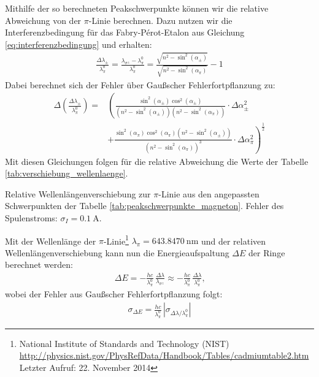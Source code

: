\documentclass[11pt, a4paper]{article}
\begin{document}
Mithilfe der so berechneten Peakschwerpunkte können wir die relative Abweichung von der $\pi$-Linie berechnen.
Dazu nutzen wir die Interferenzbedingung für das Fabry-Pérot-Etalon aus Gleichung \ref{eq:interferenzbedingung} und erhalten:
\begin{align}
	\frac{\Delta \lambda_\pm}{\lambda_\pi^0} = \frac{\lambda_{\sigma^\pm} - \lambda_\pi^0}{\lambda_\pi^0} = \frac{\sqrt{n^2 - \sin^2(\alpha_{\pm})}}{\sqrt{n^2 - \sin^2(\alpha_\pi)}} - 1
\end{align}
Dabei berechnet sich der  Fehler über Gaußscher Fehlerfortpflanzung zu:
\begin{align}
	\Delta \left( \frac{\Delta \lambda_\pm}{\lambda_\pi^0} \right) = & \left( \frac{\sin^2(\alpha_\pm) \cos^2(\alpha_\pm)}{(n^2-\sin^2(\alpha_\pm))(n^2-\sin^2(\alpha_\pi))} \cdot \Delta \alpha_\pm^2 \right. \nonumber\\
	& \left. + \frac{\sin^2(\alpha_\pi) \cos^2(\alpha_\pi) (n^2 - \sin^2(\alpha_\pm))}{(n^2-\sin^2(\alpha_\pi))^3} \cdot \Delta \alpha_\pi^2\right)^\frac{1}{2}
\end{align}
Mit diesen Gleichungen folgen für die relative Abweichung die Werte der Tabelle \ref{tab:verschiebung_wellenlaenge}. 
\begin{table}[h]
	\centering
	
	\caption{Relative Wellenlängenverschiebung zur $\pi$-Linie aus den angepassten Schwerpunkten der Tabelle \ref{tab:peakschwerpunkte_magneton}. Fehler des Spulenstroms: $\sigma_I = \SI{0.1}{\ampere}$.}
	\label{tab:verschiebung_wellenlaenge}
\end{table}
Mit der Wellenlänge der $\pi$-Linie\footnote{National Institute of Standards and Technology (NIST)\\ \url{http://physics.nist.gov/PhysRefData/Handbook/Tables/cadmiumtable2.htm}\\Letzter Aufruf: 22. November 2014} $\lambda_\pi = \SI{643,8470}{\nano\metre}$  und der relativen Wellenlängenverschiebung kann nun die Energieaufspaltung $\Delta E$ der Ringe berechnet werden:
\begin{align}
	\Delta E = -\frac{h c}{\lambda_\pi^0}\,\frac{\Delta \lambda}{\lambda_{\sigma^\pm}} \approx -\frac{h c}{\lambda_\pi^0}\,\frac{\Delta \lambda}{\lambda_\pi^0} \text{,}
\end{align}
wobei der Fehler aus Gaußscher Fehlerfortpflanzung folgt:
\begin{align}
	\sigma_{\Delta E} = \frac{h c}{\lambda_\pi^0} \, | \sigma_{\Delta \lambda / \lambda_\pi^0} |
\end{align}
\end{document}
